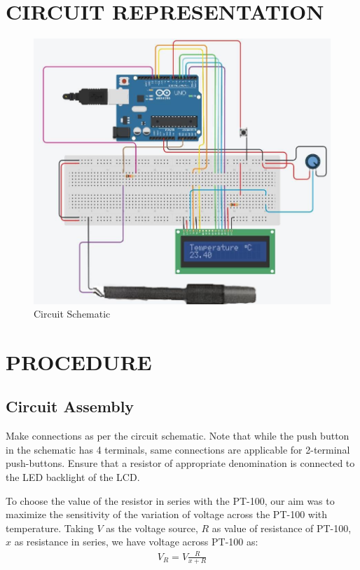 \documentclass{article}
\begin{document}
\section*{CIRCUIT REPRESENTATION}
\begin{figure}[H]
    \centering
    \includegraphics[width=0.9\columnwidth]{figs/circuit_schematic.jpg}
    \caption{Circuit Schematic}
    \label{fig:schematic}
\end{figure}

\newpage
\section{PROCEDURE}

\subsection{Circuit Assembly}
Make connections as per the circuit schematic. Note that while the push button in the schematic has 4 terminals, same connections are applicable for 2-terminal push-buttons.
Ensure that a resistor of appropriate denomination is connected to the LED backlight of the LCD.

To choose the value of the resistor in series with the PT-100, our aim was to maximize the sensitivity of the variation of voltage across the PT-100 with temperature.
Taking $V$ as the voltage source, $R$ as value of resistance of PT-100, $x$ as resistance in series, we have voltage across PT-100 as:
\begin{align} V_{R} = V \frac{R}{x+R} \end{align}
    
\end{document}

